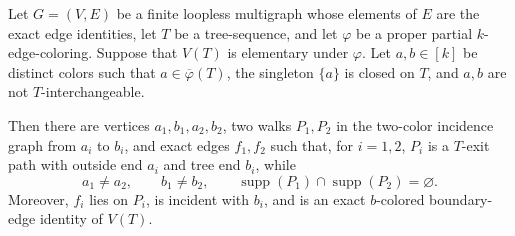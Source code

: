 \begin{lemma}
Let $G=(V,E)$ be a finite loopless multigraph whose elements of $E$ are
the exact edge identities, let $T$ be a tree-sequence, and let $\varphi$
be a proper partial $k$-edge-coloring.  Suppose that $V(T)$ is elementary
under $\varphi$.  Let $a,b\in[k]$ be distinct colors such that
$a\in\overline\varphi(T)$, the singleton $\{a\}$ is closed on $T$, and
$a,b$ are not $T$-interchangeable.

Then there are vertices $a_1,b_1,a_2,b_2$, two walks $P_1,P_2$ in the
two-color incidence graph from $a_i$ to $b_i$, and exact edges $f_1,f_2$
such that, for $i=1,2$, $P_i$ is a $T$-exit path with outside end $a_i$
and tree end $b_i$, while
\[
 a_1\ne a_2,\qquad b_1\ne b_2,\qquad
 \operatorname{supp}(P_1)\cap\operatorname{supp}(P_2)=\varnothing.
\]
Moreover, $f_i$ lies on $P_i$, is incident with $b_i$, and is an exact
$b$-colored boundary-edge identity of $V(T)$.
\end{lemma}
